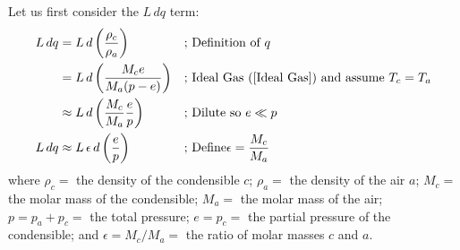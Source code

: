 Let us first consider the $L\,dq$ term:
\begin{align*}
    L\,dq&=L\, d \left( \frac{\rho_c}{\rho_a} \right)
        &\text{; }
        &\text{Definition of }q
        \\
        &=L\, d \left( \frac{M_c e}{M_a (p-e)} \right)
        &\text{; }
        &\text{Ideal Gas (\ref{Ideal Gas}) and assume }T_c=T_a
        \\
        &\approx L\, d \left( \frac{M_c}{M_a} \frac{e}{p} \right)
        &\text{; }
        &\text{Dilute so }e\ll p
        \\
    L\,dq&\approx L \,\epsilon \,d \left( \frac{e}{p} \right)
        &\text{; }
        &\text{Define}\epsilon=\frac{M_c}{M_a}
\end{align*}
where $\rho_c=$ the density of the condensible $c$; $\rho_a=$ the density of the air $a$; $M_c=$ the molar mass of the condensible; $M_a=$ the molar mass of the air; $p=p_a+p_c=$ the total pressure; $e=p_c=$ the partial pressure of the condensible; and $\epsilon=M_c/M_a=$ the ratio of molar masses $c$ and $a$.

